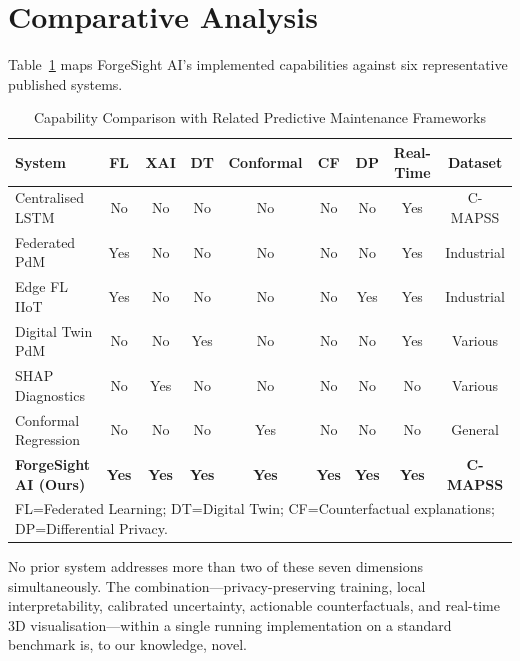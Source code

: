 \documentclass[10pt, journal, letterpaper]{IEEEtran}
\begin{document}
\section{Comparative Analysis}
\label{sec:comparative}

Table~\ref{tab:comparison} maps ForgeSight AI's implemented capabilities
against six representative published systems.

\begin{table}[t]
\caption{Capability Comparison with Related Predictive Maintenance Frameworks}
\label{tab:comparison}
\centering\small
\begin{tabular}{lcccccccc}
\toprule
\textbf{System} & \textbf{FL} & \textbf{XAI} & \textbf{DT}
  & \textbf{Conformal} & \textbf{CF} & \textbf{DP}
  & \textbf{Real-Time} & \textbf{Dataset} \\
\midrule
Centralised LSTM~\cite{asif2022}
  & No  & No  & No  & No  & No  & No  & Yes & C-MAPSS \\
Federated PdM~\cite{hosni2026}
  & Yes & No  & No  & No  & No  & No  & Yes & Industrial \\
Edge FL IIoT~\cite{sah2025}
  & Yes & No  & No  & No  & No  & Yes & Yes & Industrial \\
Digital Twin PdM~\cite{zhong2023}
  & No  & No  & Yes & No  & No  & No  & Yes & Various \\
SHAP Diagnostics~\cite{lundberg2017}
  & No  & Yes & No  & No  & No  & No  & No  & Various \\
Conformal Regression~\cite{angelopoulos2021}
  & No  & No  & No  & Yes & No  & No  & No  & General \\
\textbf{ForgeSight AI (Ours)}
  & \textbf{Yes} & \textbf{Yes} & \textbf{Yes}
  & \textbf{Yes} & \textbf{Yes} & \textbf{Yes}
  & \textbf{Yes} & \textbf{C-MAPSS} \\
\bottomrule
\multicolumn{9}{l}{\footnotesize
  FL=Federated Learning; DT=Digital Twin; CF=Counterfactual explanations;
  DP=Differential Privacy.}
\end{tabular}
\end{table}

No prior system addresses more than two of these seven dimensions
simultaneously. The combination—privacy-preserving training, local
interpretability, calibrated uncertainty, actionable counterfactuals, and
real-time 3D visualisation—within a single running implementation on a
standard benchmark is, to our knowledge, novel.

\end{document}
